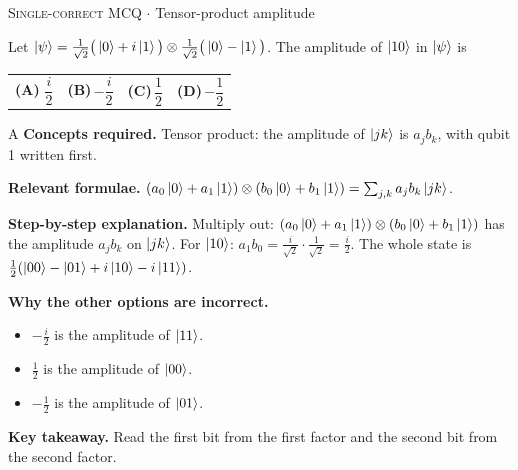 \documentclass[11pt,a4paper]{article}
\newcommand{\optlabel}[1]{\textbf{(#1)}}
\newcommand{\correctlabel}[1]{\textcolor{okgreen}{\textbf{(#1)}\,\ding{51}}}
\newenvironment{qitem}[1]{\begin{list}{}{\setlength{\leftmargin}{3.3em}\setlength{\labelwidth}{3.1em}%
  \setlength{\labelsep}{0.2em}\setlength{\topsep}{3pt}\setlength{\parsep}{3pt}}\item[\textbf{Q.#1}\hfill]}{\end{list}}
\newcommand{\qsep}{\par\vspace{2pt}{\color{black!15}\hrule}\vspace{4pt}}
\newcommand{\qmeta}[2]{{\footnotesize\color{black!60}\textsc{#1} \;$\cdot$\; #2}\par}
\begin{document}
\begin{qitem}{22}
\qmeta{Single-correct MCQ}{Tensor-product amplitude}
Let $\ket\psi = \frac{1}{\sqrt2}\big(\ket0 + i\ket1\big) \otimes \frac{1}{\sqrt2}\big(\ket0 - \ket1\big)$. The amplitude of $\ket{10}$ in $\ket\psi$ is
\par\smallskip\noindent\begin{tabularx}{\linewidth}{@{}*{4}{L}@{}}
\correctlabel{A}\,$\dfrac{i}{2}$ & \optlabel{B}\,$-\dfrac{i}{2}$ & \optlabel{C}\,$\dfrac12$ & \optlabel{D}\,$-\dfrac12$
\end{tabularx}
\end{qitem}
\begin{solbox}{A}
\textbf{\color{brand}Concepts required.} Tensor product: the amplitude of $\ket{jk}$ is $a_jb_k$, with qubit 1 written first.

\textbf{\color{brand}Relevant formulae.} $(a_0\ket0 + a_1\ket1)\otimes(b_0\ket0 + b_1\ket1) = \sum_{j,k}a_jb_k\ket{jk}$.

\textbf{\color{brand}Step-by-step explanation.} Multiply out: $(a_0\ket0 + a_1\ket1)\otimes(b_0\ket0 + b_1\ket1)$ has the amplitude $a_jb_k$ on $\ket{jk}$. For $\ket{10}$: $a_1b_0 = \frac{i}{\sqrt2}\cdot\frac{1}{\sqrt2} = \frac{i}{2}$.
The whole state is $\frac12(\ket{00} - \ket{01} + i\ket{10} - i\ket{11})$.

\textbf{\color{brand}Why the other options are incorrect.}
\begin{itemize}[leftmargin=2.4em, itemsep=1pt, topsep=2pt]
\item[\textbf{(B)}] $-\frac i2$ is the amplitude of $\ket{11}$.
\item[\textbf{(C)}] $\frac12$ is the amplitude of $\ket{00}$.
\item[\textbf{(D)}] $-\frac12$ is the amplitude of $\ket{01}$.
\end{itemize}
\textbf{\color{brand}Key takeaway.} Read the first bit from the first factor and the second bit from the second factor.
\end{solbox}
\qsep
\end{document}
